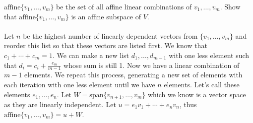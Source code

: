 \documentclass[11pt]{amsart}
\theoremstyle{definition}  %
\begin{document}
$\mathrm{affine}\{v_1, \ldots, v_m\}$ be the set of all affine linear combinations of $v_1, \ldots, v_m$. 
Show that $\mathrm{affine}\{v_1, \ldots, v_m\}$ is an affine subspace of $V$.  \\
\\
Let $n$ be the highest number of linearly dependent vectors from $\{v_1, \dots, v_m\}$ and reorder this list so that these vectors are listed first.  We know that $c_1+\cdots+c_m=1$.  We can make a new list $d_1,\dots,d_{m-1}$ with one less element such that $d_i=c_i+\frac{c_m}{m-1}$ whose sum is still 1.  Now we have a linear combination of $m-1$ elements.  We repeat this process, generating a new set of elements with each iteration with one less element until we have $n$ elements. Let's call these elements $e_1,\dots,e_n$.  Let $W=\mathrm{span}\{v_{n+1}, \dots, v_m\}$ which we know is a vector space as they are linearly independent.  Let $u=e_1v_1+\cdots+e_nv_n$, thus $\mathrm{affine}\{v_1,\dots,v_m\} = u+W$.
\end{document}
